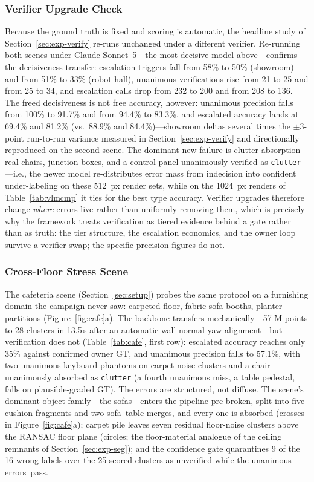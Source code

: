 \documentclass[electronics,article,accept,pdftex,moreauthors]{Definitions/mdpi}
\begin{document}
\subsubsection{Verifier Upgrade Check}
Because the ground truth is fixed and scoring is automatic, the headline
study of Section~\ref{sec:exp-verify} re-runs unchanged under a different
verifier. Re-running both scenes under Claude Sonnet~5---the most
decisive model above---confirms the decisiveness transfer: escalation
triggers fall from 58\% to 50\% (showroom) and from 51\% to 33\% (robot
hall), unanimous verifications rise from 21 to 25 and from 25 to 34, and
escalation calls drop from 232 to 200 and from 208 to 136. The freed
decisiveness is not free accuracy, however: unanimous precision falls
from 100\% to 91.7\% and from 94.4\% to 83.3\%, and escalated accuracy
lands at 69.4\% and 81.2\% (vs.\ 88.9\% and 84.4\%)---showroom deltas
several times the $\pm$3-point run-to-run variance measured in
Section~\ref{sec:exp-verify} and directionally reproduced on the second
scene. The dominant new
failure is clutter absorption---real chairs, junction boxes, and a
control panel unanimously verified as \texttt{clutter}---i.e., the newer
model re-distributes error mass from indecision into confident
under-labeling on these 512~px render sets, while on the 1024~px renders
of Table~\ref{tab:vlmcmp} it ties for the best type accuracy.
Verifier upgrades therefore change \emph{where} errors live rather than
uniformly removing them, which is precisely why the framework treats
verification as tiered evidence behind a gate rather than as truth: the
tier structure, the escalation economics, and the owner loop survive a
verifier swap; the specific precision figures do not.



\subsubsection{Cross-Floor Stress Scene}
The cafeteria scene (Section~\ref{sec:setup}) probes the same protocol on
a furnishing domain the campaign never saw: carpeted floor, fabric sofa
booths, planter partitions (Figure~\ref{fig:cafe}a). The backbone
transfers mechanically---57 M points to 28 clusters in 13.5\,s after an
automatic wall-normal yaw alignment---but verification does not
(Table~\ref{tab:cafe}, first row): escalated accuracy reaches only
35\% against confirmed owner GT, and unanimous precision falls to
57.1\%, with two unanimous keyboard phantoms on carpet-noise clusters
and a chair unanimously absorbed as \texttt{clutter} (a fourth
unanimous miss, a table pedestal, falls on plausible-graded GT). The
errors are structured, not diffuse. The scene's
dominant object family---the sofas---enters the pipeline pre-broken,
split into five cushion fragments and two sofa--table merges, and every
one is absorbed (crosses in Figure~\ref{fig:cafe}a); carpet pile leaves
seven residual floor-noise clusters above the RANSAC floor plane
(circles; the floor-material analogue of the ceiling remnants of
Section~\ref{sec:exp-seg}); and the confidence gate quarantines 9 of the
16 wrong labels over the 25 scored clusters as unverified while the
unanimous \mbox{errors pass}.
\end{document}
